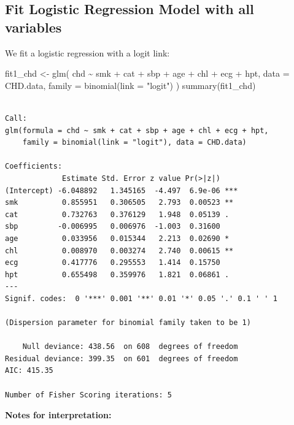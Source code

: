 \documentclass[
  letterpaper,
]{scrbook}
\newenvironment{Shaded}{\begin{snugshade}}{\end{snugshade}}
\newcommand{\AttributeTok}[1]{\textcolor[rgb]{0.40,0.45,0.13}{#1}}
\newcommand{\FunctionTok}[1]{\textcolor[rgb]{0.28,0.35,0.67}{#1}}
\newcommand{\NormalTok}[1]{\textcolor[rgb]{0.00,0.23,0.31}{#1}}
\newcommand{\OtherTok}[1]{\textcolor[rgb]{0.00,0.23,0.31}{#1}}
\newcommand{\SpecialCharTok}[1]{\textcolor[rgb]{0.37,0.37,0.37}{#1}}
\newcommand{\StringTok}[1]{\textcolor[rgb]{0.13,0.47,0.30}{#1}}
\begin{document}
\subsection{Fit Logistic Regression Model with all
variables}\label{fit-logistic-regression-model-with-all-variables}

We fit a logistic regression with a logit link:

\begin{Shaded}
\begin{Highlighting}[]
\NormalTok{fit1\_chd }\OtherTok{\textless{}{-}} \FunctionTok{glm}\NormalTok{(}
\NormalTok{  chd }\SpecialCharTok{\textasciitilde{}}\NormalTok{ smk }\SpecialCharTok{+}\NormalTok{ cat }\SpecialCharTok{+}\NormalTok{ sbp }\SpecialCharTok{+}\NormalTok{ age }\SpecialCharTok{+}\NormalTok{ chl }\SpecialCharTok{+}\NormalTok{ ecg }\SpecialCharTok{+}\NormalTok{ hpt,}
  \AttributeTok{data =}\NormalTok{ CHD.data,}
  \AttributeTok{family =} \FunctionTok{binomial}\NormalTok{(}\AttributeTok{link =} \StringTok{"logit"}\NormalTok{)}
\NormalTok{)}
\FunctionTok{summary}\NormalTok{(fit1\_chd)}
\end{Highlighting}
\end{Shaded}

\begin{verbatim}

Call:
glm(formula = chd ~ smk + cat + sbp + age + chl + ecg + hpt, 
    family = binomial(link = "logit"), data = CHD.data)

Coefficients:
             Estimate Std. Error z value Pr(>|z|)    
(Intercept) -6.048892   1.345165  -4.497  6.9e-06 ***
smk          0.855951   0.306505   2.793  0.00523 ** 
cat          0.732763   0.376129   1.948  0.05139 .  
sbp         -0.006995   0.006976  -1.003  0.31600    
age          0.033956   0.015344   2.213  0.02690 *  
chl          0.008970   0.003274   2.740  0.00615 ** 
ecg          0.417776   0.295553   1.414  0.15750    
hpt          0.655498   0.359976   1.821  0.06861 .  
---
Signif. codes:  0 '***' 0.001 '**' 0.01 '*' 0.05 '.' 0.1 ' ' 1

(Dispersion parameter for binomial family taken to be 1)

    Null deviance: 438.56  on 608  degrees of freedom
Residual deviance: 399.35  on 601  degrees of freedom
AIC: 415.35

Number of Fisher Scoring iterations: 5
\end{verbatim}

\textbf{Notes for interpretation:}
\end{document}
